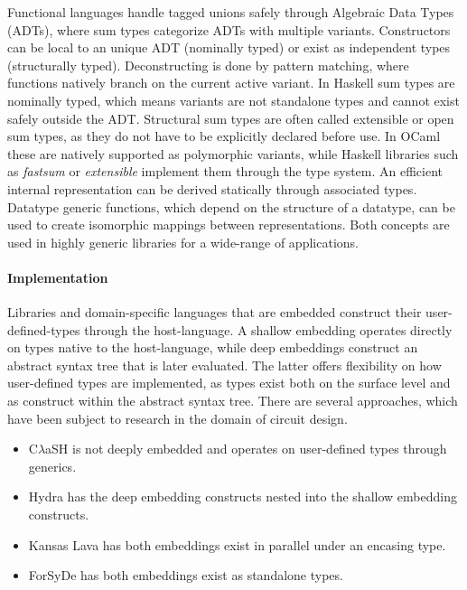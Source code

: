 \documentclass{article}
\begin{document}
Functional languages handle tagged unions safely through Algebraic Data Types (ADTs), where sum types categorize ADTs with multiple variants.
Constructors can be local to an unique ADT (nominally typed) or exist as independent types (structurally typed).
Deconstructing is done by pattern matching, where functions natively branch on the current active variant.
In Haskell sum types are nominally typed, which means variants are not standalone types and cannot exist safely outside the ADT.
Structural sum types are often called extensible or open sum types, as they do not have to be explicitly declared before use.
In OCaml these are natively supported as polymorphic variants, while Haskell libraries such as {\it fastsum} or {\it extensible} implement them through the type system.
An efficient internal representation can be derived statically through associated types\cite{associated-types}.
Datatype generic functions, which depend on the structure of a datatype, can be used to create isomorphic mappings between representations.
Both concepts are used in highly generic libraries for a wide-range of applications\cite{generic-programming}. 

\paragraph{Implementation}

Libraries and domain-specific languages that are embedded construct their user-defined-types through the host-language.
A shallow embedding operates directly on types native to the host-language, while deep embeddings construct an abstract syntax tree that is later evaluated.
The latter offers flexibility on how user-defined types are implemented, as types exist both on the surface level and as construct within the abstract syntax tree.   
There are several approaches, which have been subject to research in the domain of circuit design.
\begin{itemize}
    \setlength\itemsep{0em}
    \item {C$\lambda$aSH} is not deeply embedded and operates on user-defined types through generics\cite{clash}. 
    \item Hydra has the deep embedding constructs nested into the shallow embedding constructs\cite{hydra}.
    \item Kansas Lava has both embeddings exist in parallel under an encasing type\cite{kansas-lava}.
    \item ForSyDe has both embeddings exist as standalone types\cite{forsyde}.
\end{itemize}
\end{document}

